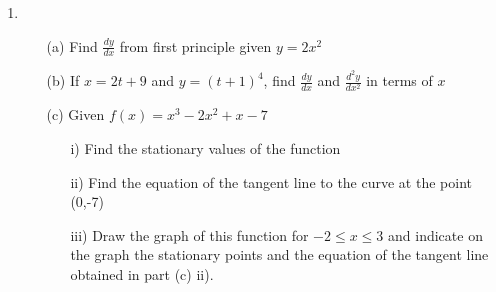 \begin{enumerate}
	\item
	\begin{enumerate}[topsep=0ex,itemsep=0ex,partopsep=1ex,parsep=1ex]
		\item[(a)] Find $\frac{dy}{dx}$ from first principle given $y = 2x^2$
		
		\item[(b)] If $x = 2t + 9$ and $y = (t + 1)^4$, find $\frac{dy}{dx}$ and $\frac{d^2y}{dx^2}$ in terms of $x$
		
		\item[(c)] Given $f(x) = x^3 - 2x^2 + x - 7$
		\begin{enumerate}[topsep=0ex,itemsep=0ex,partopsep=1ex,parsep=1ex]
			\item[i)] Find the stationary values of the function
			\item[ii)] Find the equation of the tangent line to the curve at the point (0,-7)
			\item[iii)] Draw the graph of this function for $-2 \leq x \leq 3$ and indicate on the graph the stationary points and the equation of the tangent line obtained in part (c) ii). 
		\end{enumerate}
	\end{enumerate}
	
\end{enumerate}









